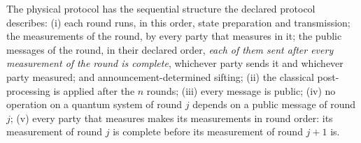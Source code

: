 \begin{assumption}\label{ass:seq}
The physical protocol has the sequential structure the declared protocol
describes:
(i) each round runs, in this order, state preparation and transmission; the
measurements of the round, by every party that measures in it; the public
messages of the round, in their declared order, \emph{each of them sent after
every measurement of the round is complete}, whichever party sends it and
whichever party measured; and announcement-determined sifting;
(ii) the classical post-processing is applied after the $n$ rounds;
(iii) every message is public;
(iv) no operation on a quantum system of round $j$ depends on a public
message of round $j$;
(v) every party that measures makes its measurements in round order: its
measurement of round $j$ is complete before its measurement of round $j+1$
is.
\end{assumption}
